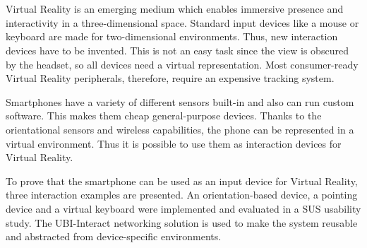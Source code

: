 \chapter{\abstractname}

Virtual Reality is an emerging medium which enables immersive presence and interactivity in a three-dimensional space. Standard input devices like a mouse or keyboard are made for two-dimensional environments. Thus, new interaction devices have to be invented. This is not an easy task since the view is obscured by the headset, so all devices need a virtual representation. Most consumer-ready Virtual Reality peripherals, therefore, require an expensive tracking system.

Smartphones have a variety of different sensors built-in and also can run custom software. This makes them cheap general-purpose devices. Thanks to the orientational sensors and wireless capabilities, the phone can be represented in a virtual environment. Thus it is possible to use them as interaction devices for Virtual Reality.

To prove that the smartphone can be used as an input device for Virtual Reality, three interaction examples are presented. An orientation-based device, a pointing device and a virtual keyboard were implemented and evaluated in a SUS usability study. The UBI-Interact networking solution is used to make the system reusable and abstracted from device-specific environments.